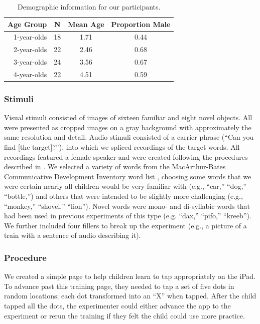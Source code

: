 \documentclass[man,noapacite]{apa2}
\begin{document}
\begin{table}[t]
\centering
\caption{\label{tab:demo} Demographic information for our participants.}
\begin{tabular}{rccc}
  \hline
Age Group & N & Mean Age & Proportion Male \\ 
  \hline
1-year-olds &  18 & 1.71 & 0.44 \\ 
2-year-olds &  22 & 2.46 & 0.68 \\ 
3-year-olds &  24 & 3.56 & 0.67 \\ 
4-year-olds &  22 & 4.51 & 0.59 \\ 
   \hline
\end{tabular}
\end{table}


\subsubsection{Stimuli}

Visual stimuli consisted of images of sixteen familiar and eight novel objects. All were presented as cropped images on a gray background with approximately the same resolution and detail.  Audio stimuli consisted of a carrier phrase (``Can you find [the target]?''), into which we spliced recordings of the target words. All recordings featured a female speaker and were created following the procedures described in . We selected a variety of words from the MacArthur-Bates Communicative Development Inventory word list \cite{fenson1994,fenson2007}, choosing some words that we were certain nearly all children would be very familiar with (e.g., ``car,'' ``dog,'' ``bottle,'') and others that were intended to be slightly more challenging (e.g., ``monkey,'' ``shovel,'' ``lion''). Novel words were mono- and di-syllabic words that had been used in previous experiments of this type (e.g. ``dax,'' ``pifo,'' ``kreeb''). We further included four fillers to break up the experiment (e.g., a picture of a train with a sentence of audio describing it).

\subsubsection{Procedure}

We created a simple page to help children learn to tap appropriately on the iPad. To advance past this training page, they needed to tap a set of five dots in random locations; each dot transformed into an ``X'' when tapped. After the child tapped all the dots, the experimenter could either advance the app to the experiment or rerun the training if they felt the child could use more practice. 
\end{document}
